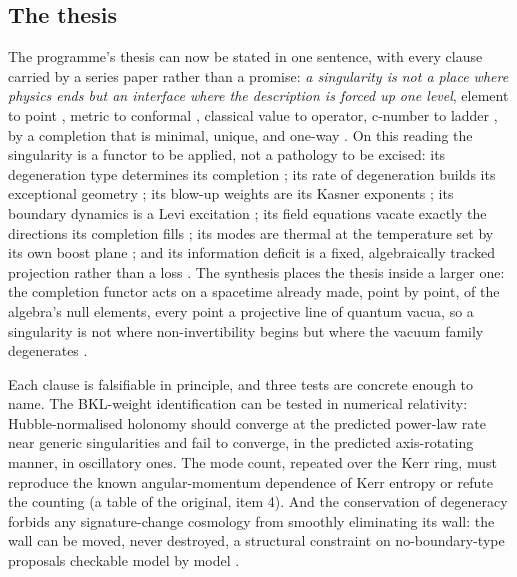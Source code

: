 \documentclass[11pt]{article}
\theoremstyle{definition}
\theoremstyle{plain}
\begin{document}
\subsection*{The thesis}
\label{c:note.programme.setting-thesis}
The programme's thesis can now be stated in one sentence, with every clause carried by a series paper rather than a promise: \emph{a singularity is not a place where physics ends but an interface where the description is forced up one level}, element to point \cite{ButlerT1}, metric to conformal \cite{ButlerT4, ButlerT6}, classical value to operator, c-number to ladder \cite{ButlerT3, ButlerT5}, by a completion that is minimal, unique, and one-way \cite{ButlerT1}. On this reading the singularity is a functor to be applied, not a pathology to be excised: its degeneration type determines its completion \cite{ButlerT1}; its rate of degeneration builds its exceptional geometry \cite{ButlerT4}; its blow-up weights are its Kasner exponents \cite{ButlerT6}; its boundary dynamics is a Levi excitation \cite{ButlerT6}; its field equations vacate exactly the directions its completion fills \cite{ButlerT10}; its modes are thermal at the temperature set by its own boost plane \cite{ButlerT5}; and its information deficit is a fixed, algebraically tracked projection rather than a loss \cite{ButlerT5}. The synthesis places the thesis inside a larger one: the completion functor acts on a spacetime already made, point by point, of the algebra's null elements, every point a projective line of quantum vacua, so a singularity is not where non-invertibility begins but where the vacuum family degenerates \cite{ButlerT16}.

Each clause is falsifiable in principle, and three tests are concrete enough to name. The BKL-weight identification can be tested in numerical relativity: Hubble-normalised holonomy should converge at the predicted power-law rate near generic singularities and fail to converge, in the predicted axis-rotating manner, in oscillatory ones. The mode count, repeated over the Kerr ring, must reproduce the known angular-momentum dependence of Kerr entropy or refute the counting (a table of the original, item 4). And the conservation of degeneracy forbids any signature-change cosmology from smoothly eliminating its wall: the wall can be moved, never destroyed, a structural constraint on no-boundary-type proposals checkable model by model \cite{ButlerT4}.
\end{document}
